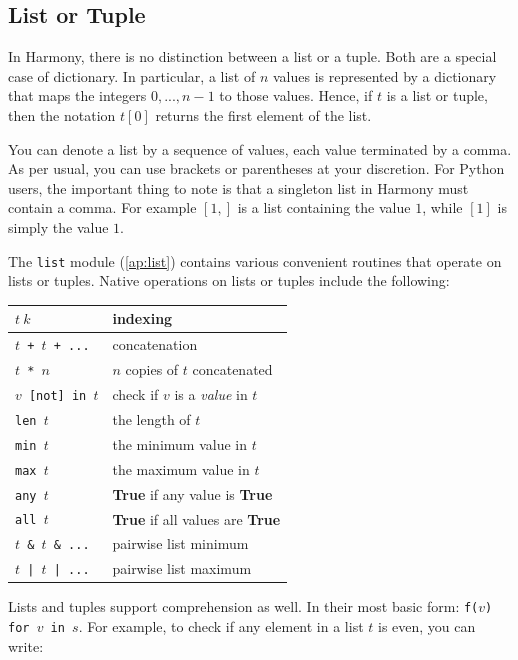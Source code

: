 \documentclass{report}
\begin{document}
\subsection*{List or Tuple}

In Harmony, there is no distinction between a list or a tuple.
Both are a special case of dictionary.  In particular, a list of
$n$ values is represented by a dictionary that maps the integers
$0, ..., n-1$ to those values.  Hence, if $t$ is a list or tuple,
then the notation $t[0]$ returns the first element of the list.

You can denote a list by a sequence of values, each value terminated
by a comma.  As per usual, you can use brackets or parentheses
at your discretion.  For Python users, the important thing to note
is that a singleton list in Harmony must contain a comma.  For
example $[1,]$ is a list containing the value $1$, while $[1]$
is simply the value $1$.

The \texttt{list} module (\autoref{ap:list}) contains various
convenient routines that operate on lists or tuples.
Native operations on lists or tuples include the following:

\begin{center}
\begin{tabular}{|l|l|}
\hline
\texttt{$t~k$} & indexing \\
\hline
\texttt{$t$ + $t$ + ...} & concatenation \\
\hline
\texttt{$t$ * $n$} & $n$ copies of $t$ concatenated \\
\hline
\texttt{$v$ [not] in $t$} & check if $v$ is a \emph{value} in $t$ \\
\hline
\texttt{len $t$} & the length of $t$ \\
\hline
\texttt{min $t$} & the minimum value in $t$ \\
\hline
\texttt{max $t$} & the maximum value in $t$ \\
\hline
\texttt{any $t$} & \textbf{True} if any value is \textbf{True} \\
\hline
\texttt{all $t$} & \textbf{True} if all values are \textbf{True} \\
\hline
\texttt{$t$ \& $t$ \& ...} & pairwise list minimum \\
\hline
\texttt{$t$ | $t$ | ...} & pairwise list maximum \\
\hline
\end{tabular}
\end{center}

Lists and tuples support comprehension as well.
In their most basic form: \texttt{f($v$) for $v$ in $s$}.
For example, to check if any element in a list $t$ is even, you
can write:
\end{document}

